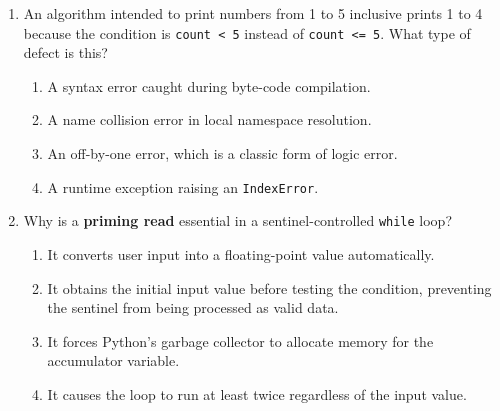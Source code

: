 \documentclass[11pt,a4paper]{article}
\begin{document}
\begin{enumerate}[label=\textbf{Q\arabic*.},leftmargin=2em,itemsep=1.5pt,topsep=1pt]
\item An algorithm intended to print numbers from 1 to 5 inclusive prints 1 to 4 because the condition is \texttt{count < 5} instead of \texttt{count <= 5}. What type of defect is this?
\begin{enumerate}[label=\Alph*.,leftmargin=2em]
  \item A syntax error caught during byte-code compilation.
  \item A name collision error in local namespace resolution.
  \item An off-by-one error, which is a classic form of logic error.
  \item A runtime exception raising an \texttt{IndexError}.
\end{enumerate}

\item Why is a \textbf{priming read} essential in a sentinel-controlled \texttt{while} loop?
\begin{enumerate}[label=\Alph*.,leftmargin=2em]
  \item It converts user input into a floating-point value automatically.
  \item It obtains the initial input value before testing the condition, preventing the sentinel from being processed as valid data.
  \item It forces Python's garbage collector to allocate memory for the accumulator variable.
  \item It causes the loop to run at least twice regardless of the input value.
\end{enumerate}

\end{enumerate}

\newpage

\end{document}
